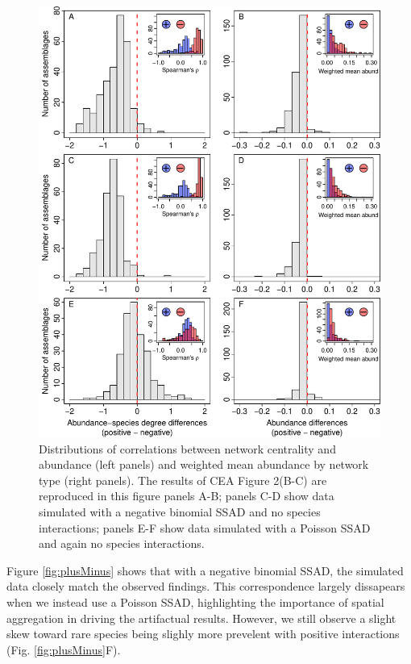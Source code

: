 \documentclass[]{article}
\begin{document}
\begin{figure}

{\centering \includegraphics{RarePlusComMinus_files/figure-latex/fig_plusMinus-1} 

}

\caption{Distributions of correlations between network centrality and abundance (left panels) and weighted mean abundance by network type (right panels). The results of CEA Figure 2(B-C) are reproduced in this figure panels A-B; panels C-D show data simulated with a negative binomial SSAD and no species interactions; panels E-F show data simulated with a Poisson SSAD and again no species interactions. \label{fig:plusMinus}}\label{fig:fig_plusMinus}
\end{figure}

Figure \ref{fig:plusMinus} shows that with a negative binomial SSAD, the
simulated data closely match the observed findings. This correspondence
largely dissapears when we instead use a Poisson SSAD, highlighting the
importance of spatial aggregation in driving the artifactual results.
However, we still observe a slight skew toward rare species being
slighly more prevelent with positive interactions (Fig.
\ref{fig:plusMinus}F).
\end{document}

